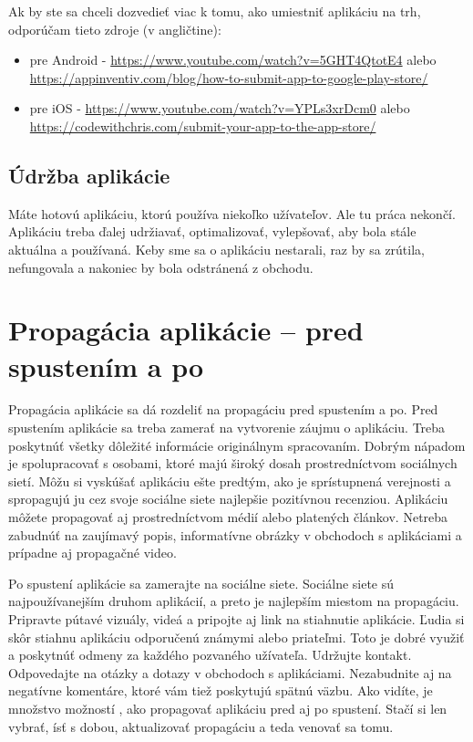 \documentclass[10pt,twoside,slovak,a4paper]{article}
\begin{document}
Ak by ste sa chceli dozvedieť viac k tomu, ako umiestniť aplikáciu na trh, odporúčam tieto zdroje (v angličtine):
	\begin{itemize}
	\item pre Android - \url{https://www.youtube.com/watch?v=5GHT4QtotE4} alebo \url{https://appinventiv.com/blog/how-to-submit-app-to-google-play-store/}
	\item pre iOS - \url{https://www.youtube.com/watch?v=YPLs3xrDcm0} alebo \url{https://codewithchris.com/submit-your-app-to-the-app-store/}
	\end{itemize}

\subsection{Údržba aplikácie}
\quad Máte hotovú aplikáciu, ktorú používa niekoľko užívateľov. Ale tu práca nekončí. Aplikáciu treba ďalej udržiavať, optimalizovať, vylepšovať, aby bola stále aktuálna a používaná. Keby sme sa o aplikáciu nestarali, raz by sa zrútila, nefungovala a nakoniec by bola odstránená z obchodu.
\cite{themanifest}



\section{Propagácia aplikácie – pred spustením a po}
\quad Propagácia aplikácie sa dá rozdeliť na propagáciu pred spustením a po. Pred spustením aplikácie sa treba zamerať na vytvorenie záujmu o aplikáciu. Treba poskytnúť všetky dôležité informácie originálnym spracovaním. Dobrým nápadom je spolupracovať s osobami, ktoré majú široký dosah prostredníctvom sociálnych sietí. Môžu si vyskúšať aplikáciu ešte predtým, ako je sprístupnená verejnosti a spropagujú ju cez svoje sociálne siete najlepšie pozitívnou recenziou. Aplikáciu môžete propagovať aj prostredníctvom médií alebo platených článkov. Netreba zabudnúť na zaujímavý popis, informatívne obrázky v obchodoch s aplikáciami a prípadne aj propagačné video.

Po spustení aplikácie sa zamerajte na sociálne siete. Sociálne siete sú najpoužívanejším druhom aplikácií, a preto je najlepším miestom na propagáciu. Pripravte pútavé vizuály, videá a pripojte aj link na stiahnutie aplikácie. Ľudia si skôr stiahnu aplikáciu odporučenú známymi alebo priateľmi. Toto je dobré využiť a poskytnúť odmeny za každého pozvaného užívateľa. Udržujte kontakt. Odpovedajte na otázky a dotazy v obchodoch s aplikáciami. Nezabudnite aj na negatívne komentáre, ktoré vám tiež poskytujú spätnú väzbu. Ako vidíte, je množstvo možností , ako propagovať aplikáciu pred aj po spustení. Stačí si len vybrať, ísť s dobou, aktualizovať propagáciu a teda venovať sa tomu.
\end{document}
